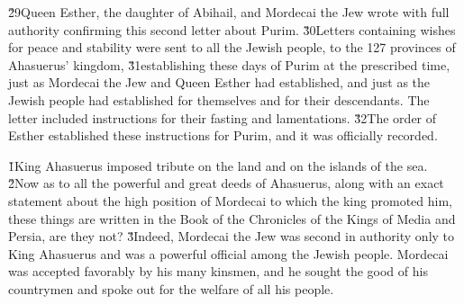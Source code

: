 \v{29}Queen Esther, the daughter of Abihail, and Mordecai the Jew wrote with full authority confirming this second letter about Purim. \v{30}Letters containing wishes for peace and stability were sent to all the Jewish people, to the 127 provinces of Ahasuerus' kingdom, \v{31}establishing these days of Purim at the prescribed time, just as Mordecai the Jew and Queen Esther had established, and just as the Jewish people had established for themselves and for their descendants. The letter included instructions for their fasting and lamentations. \v{32}The order of Esther established these instructions for Purim, and it was officially recorded.

\v{1}King Ahasuerus imposed tribute on the land and on the islands of the sea. \v{2}Now as to all the powerful and great deeds of Ahasuerus, along with an exact statement about the high position of Mordecai to which the king promoted him, these things are written in the Book of the Chronicles of the Kings of Media and Persia, are they not? \v{3}Indeed, Mordecai the Jew was second in authority only to King Ahasuerus and was a powerful official among the Jewish people. Mordecai was accepted favorably by his many kinsmen, and he sought the good of his countrymen and spoke out for the welfare of all his people.
